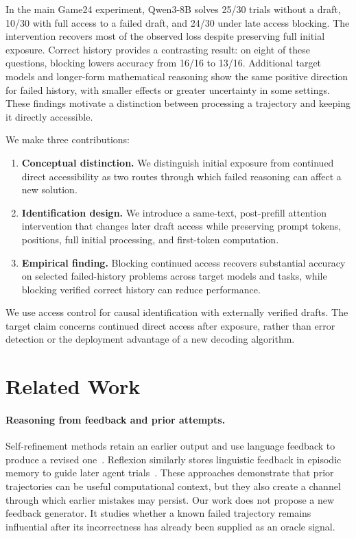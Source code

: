 \documentclass{article}
\begin{document}
In the main Game24 experiment, Qwen3-8B solves 25/30 trials without a draft, 10/30 with full access to a failed draft, and 24/30 under late access blocking. The intervention recovers most of the observed loss despite preserving full initial exposure. Correct history provides a contrasting result: on eight of these questions, blocking lowers accuracy from 16/16 to 13/16. Additional target models and longer-form mathematical reasoning show the same positive direction for failed history, with smaller effects or greater uncertainty in some settings. These findings motivate a distinction between processing a trajectory and keeping it directly accessible.

We make three contributions:
\begin{enumerate}
    \item \textbf{Conceptual distinction.} We distinguish initial exposure from continued direct accessibility as two routes through which failed reasoning can affect a new solution.
    \item \textbf{Identification design.} We introduce a same-text, post-prefill attention intervention that changes later draft access while preserving prompt tokens, positions, full initial processing, and first-token computation.
    \item \textbf{Empirical finding.} Blocking continued access recovers substantial accuracy on selected failed-history problems across target models and tasks, while blocking verified correct history can reduce performance.
\end{enumerate}

We use access control for causal identification with externally verified drafts. The target claim concerns continued direct access after exposure, rather than error detection or the deployment advantage of a new decoding algorithm.

\section{Related Work}

\paragraph{Reasoning from feedback and prior attempts.}
Self-refinement methods retain an earlier output and use language feedback to produce a revised one~\citep{madaan2023selfrefine}. Reflexion similarly stores linguistic feedback in episodic memory to guide later agent trials~\citep{shinn2023reflexion}. These approaches demonstrate that prior trajectories can be useful computational context, but they also create a channel through which earlier mistakes may persist. Our work does not propose a new feedback generator. It studies whether a known failed trajectory remains influential after its incorrectness has already been supplied as an oracle signal.
\end{document}

